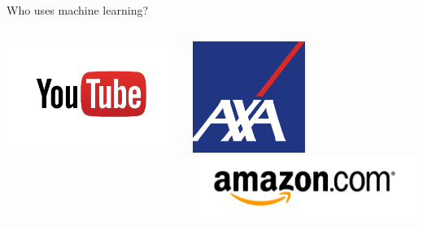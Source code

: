 \documentclass[pdf]{beamer}
\begin{document}
\begin{frame}{Who uses machine learning?}
\begin{columns}
\begin{center}
	\includegraphics[width=\textwidth]{youtube.png}
\end{center}
\begin{center}
	\includegraphics[width=0.5\textwidth]{AXA.png}\\
	\vspace{2cm}
	\includegraphics[width=\textwidth]{amazon.jpg}
\end{center}
\end{columns}
\end{frame}
\end{document}
